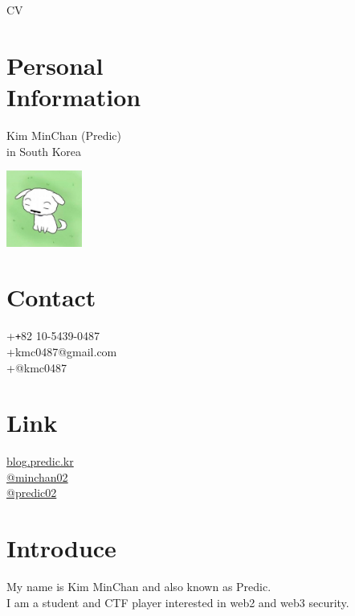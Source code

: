 \documentclass[margin,line]{resume}
\begin{document}
{\sc \Large CV}
\begin{resume}

\begin{minipage}{0.75\textwidth}
  \section{\mysidestyle Personal\\Information}
  Kim MinChan (Predic) \\
  in South Korea
\end{minipage}
\hfill
\begin{minipage}{0.2\textwidth}
  \begin{flushright}
    \includegraphics[width=2.5cm]{profile_image.jpg}
  \end{flushright}
\end{minipage}

    \section{\mysidestyle Contact}
    \faPhone  \space +\texttt{+}82 10-5439-0487 \\
    \faEnvelope  \space +kmc0487@gmail.com \\
     +@kmc0487

    \section{\mysidestyle Link}
    \faLink  \space \href{https://blog.predic.kr}{blog.predic.kr} \\ 
    \faGithub  \space \href{https://github.com/minchan02}{@minchan02} \\
    \faTwitter \space \href{https://x.com/predic02}{@predic02} 
   

    \section{\mysidestyle Introduce}
    My name is Kim MinChan and also known as Predic. \\
    I am a student and CTF player interested in web2 and web3 security.
 

\end{resume}
\end{document}
